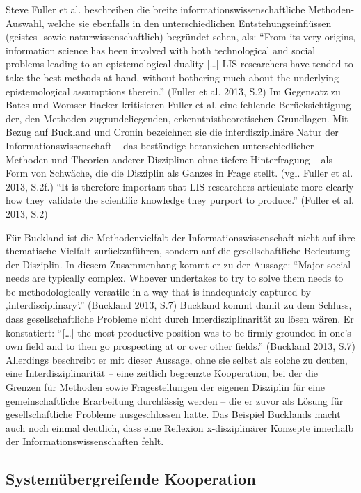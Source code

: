 \documentclass[a4paper,
fontsize=11pt,
oneside,
numbers=noperiodatend,
parskip=half-,
bibliography=totoc,
final
]{scrartcl}
\begin{document}
Steve Fuller et al. beschreiben die breite informationswissenschaftliche
Methoden-Auswahl, welche sie ebenfalls in den unterschiedlichen
Entstehungseinflüssen (geistes- sowie naturwissenschaftlich) begründet
sehen, als: \enquote{From its very origins, information science has been
involved with both technological and social problems leading to an
epistemological duality {[}\ldots{}{]} LIS researchers have tended to
take the best methods at hand, without bothering much about the
underlying epistemological assumptions therein.} (Fuller et al. 2013,
S.2) Im Gegensatz zu Bates und Womser-Hacker kritisieren Fuller et al.
eine fehlende Berücksichtigung der, den Methoden zugrundeliegenden,
erkenntnistheoretischen Grundlagen. Mit Bezug auf Buckland und Cronin
bezeichnen sie die interdisziplinäre Natur der Informationswissenschaft
-- das beständige heranziehen unterschiedlicher Methoden und Theorien
anderer Disziplinen ohne tiefere Hinterfragung -- als Form von Schwäche,
die die Disziplin als Ganzes in Frage stellt. (vgl. Fuller et al. 2013,
S.2f.) \enquote{It is therefore important that LIS researchers
articulate more clearly how they validate the scientific knowledge they
purport to produce.} (Fuller et al. 2013, S.2)

Für Buckland ist die Methodenvielfalt der Informationswissenschaft nicht
auf ihre thematische Vielfalt zurückzuführen, sondern auf die
gesellschaftliche Bedeutung der Disziplin. In diesem Zusammenhang kommt
er zu der Aussage: \enquote{Major social needs are typically complex.
Whoever undertakes to try to solve them needs to be methodologically
versatile in a way that is inadequately captured by
‚interdisciplinary'.} (Buckland 2013, S.7) Buckland kommt damit zu dem
Schluss, dass gesellschaftliche Probleme nicht durch
Interdisziplinarität zu lösen wären. Er konstatiert:
\enquote{{[}\ldots{}{]} the most productive position was to be firmly
grounded in one's own field and to then go prospecting at or over other
fields.} (Buckland 2013, S.7) Allerdings beschreibt er mit dieser
Aussage, ohne sie selbst als solche zu deuten, eine Interdisziplinarität
-- eine zeitlich begrenzte Kooperation, bei der die Grenzen für Methoden
sowie Fragestellungen der eigenen Disziplin für eine gemeinschaftliche
Erarbeitung durchlässig werden -- die er zuvor als Lösung für
gesellschaftliche Probleme ausgeschlossen hatte. Das Beispiel Bucklands
macht auch noch einmal deutlich, dass eine Reflexion x-disziplinärer
Konzepte innerhalb der Informationswissenschaften fehlt.

\subsection*{Systemübergreifende
Kooperation}\label{systemuxfcbergreifende-kooperation}
\end{document}

